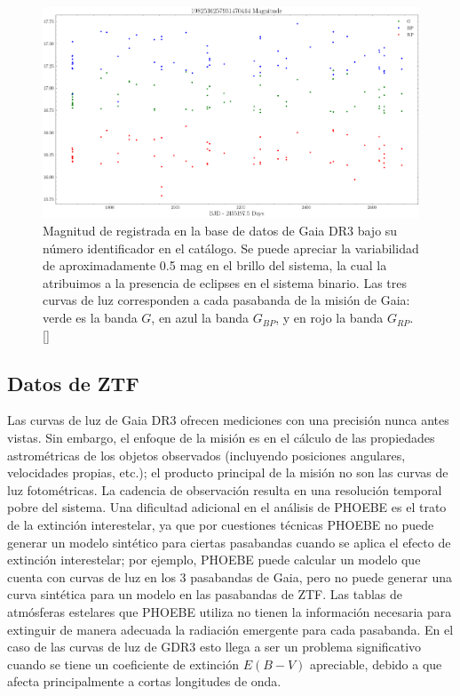 \begin{figure}[!ht]
	\centering
	\includegraphics[scale=0.42]{Muestra/Secciones/Figures/GDR3-Light-Curves.png}
	\caption{Magnitud de \atoObjId registrada en la base de datos de Gaia DR3
	bajo su número identificador en el catálogo. Se puede apreciar la
	variabilidad de aproximadamente 0.5 mag en el brillo del sistema, la cual la
	atribuimos a la presencia de eclipses en el sistema binario. Las tres curvas
	de luz corresponden a cada pasabanda de la misión de Gaia: verde es la banda
	$G$, en azul la banda $G_{BP}$, y en rojo la banda $G_{RP}$.
	[]}
	\label{gdr3AtoObjLightCurves}
\end{figure}

\subsection{Datos de ZTF}

Las curvas de luz de Gaia DR3 ofrecen mediciones con una precisión nunca antes
vistas. Sin embargo, el enfoque de la misión es en el cálculo de las propiedades
astrométricas de los objetos observados (incluyendo posiciones angulares,
velocidades propias, etc.); el producto principal de la misión no son las curvas
de luz fotométricas. La cadencia de observación resulta en una resolución
temporal pobre del sistema. Una dificultad adicional en el análisis de PHOEBE es
el trato de la extinción interestelar, ya que por cuestiones técnicas PHOEBE no
puede generar un modelo sintético para ciertas pasabandas cuando se aplica el
efecto de extinción interestelar; por ejemplo, PHOEBE puede calcular un
modelo que cuenta con curvas de luz en los 3 pasabandas de Gaia, pero no puede
generar una curva sintética para un modelo en las pasabandas de ZTF. Las tablas
de atmósferas estelares que PHOEBE utiliza no tienen la información necesaria
para extinguir de manera adecuada la radiación emergente para cada pasabanda.
En el caso de las curvas de luz de GDR3 esto llega a ser un problema
significativo cuando se tiene un coeficiente de extinción $E(B - V)$ apreciable,
debido a que afecta principalmente a cortas longitudes de onda.

